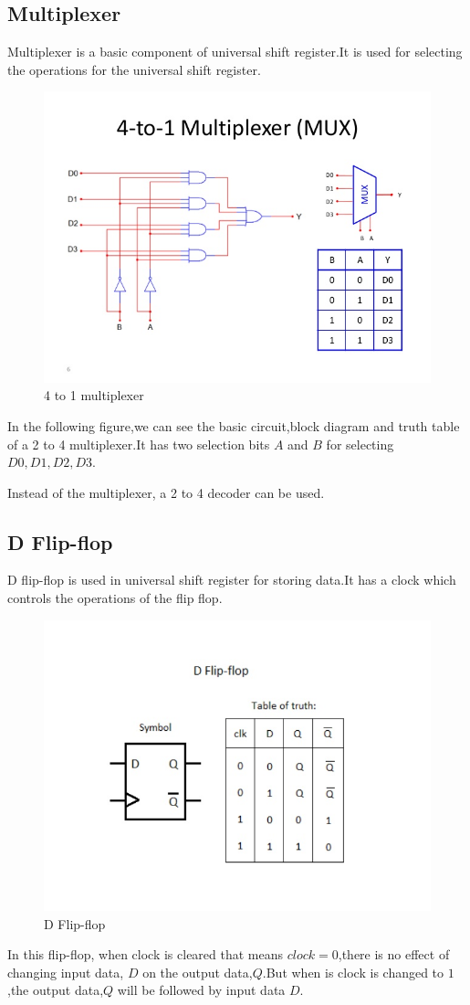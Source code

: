 \documentclass{article}
\begin{document}
\begin{flushleft}
\subsection{Multiplexer}
Multiplexer is a basic component of universal shift register.It is used for selecting the operations for the universal shift register.\\
\begin{figure}[!h]
    \centering
    \includegraphics[width=.8\textwidth]{pics/4to1mux.jpg}
    \caption{4 to 1 multiplexer}
    \label{fig:mux}
\end{figure}
In the following figure,we can see the basic circuit,block diagram and truth table of a 2 to 4 multiplexer.It has two selection bits $A$ and $B$ for selecting $D0,D1,D2,D3.$ 

Instead of the multiplexer, a 2 to 4 decoder can be used. \newpage
\subsection{D Flip-flop}
D flip-flop is used in universal shift register for storing data.It has a clock which controls the operations of the flip flop.\\
\begin{figure}[!h]
    \centering
    \includegraphics[width=.8\textwidth]{pics/flipflop.jpg}
    \caption{D Flip-flop}
    \label{fig:flip-flop}
\end{figure}
In this flip-flop, when clock is cleared that means $clock=0$,there is no effect of changing input data, $D$ on the output data,$Q$.But when is clock is changed to $1$,the output data,$Q$ will be followed by input data $D$.


\end{flushleft}
\end{document}
